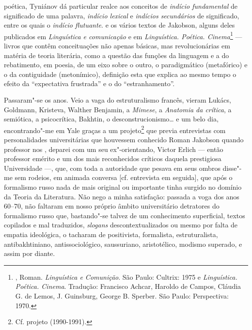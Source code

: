 {{ poética, Tyniánov dá particular realce aos conceitos de \emph{indício
 fundamental} de significado de uma palavra, \emph{indício lexical}
 e \emph{indícios secundários} de significado, entre os quais o
 \emph{indício flutuante}.} e os vários textos de Jakobson, alguns
deles publicados em \emph{Linguística e comunicação} e em
\emph{Linguística. Poética. Cinema}\footnote{, Roman.
 \emph{Linguística e Comunição}. São Paulo: Cultrix: 1975 e
 \emph{Linguística. Poética. Cinema}. Tradução: Francisco Achcar, 
Haroldo de Campos, Cláudia G. de Lemos, J. Guinsburg, George B.
 Sperber. São Paulo: Perspectiva: 1970.} --- livros que contêm conceituações
não apenas básicas, mas revolucionárias em matéria de teoria literária,
como a questão das funções da linguagem e a do rebatimento, em poesia, de
um eixo sobre o outro, o paradigmático (metafórico) e o da contiguidade
(metonímico), definição esta que explica ao mesmo tempo o efeito da
``expectativa frustrada'' e o do ``estranhamento''.

Passaram"-se os anos. Veio a vaga do estruturalismo francês, vieram
Lukács, Goldmann, Kristeva, Walther Benjamin, a \emph{Mimese}, a
\emph{Anatomia da crítica}, a semiótica, a psicocrítica, Bakhtin, o
desconstrucionismo\ldots{} e um belo dia, encontrando"-me em Yale graças a um
projeto\footnote{Cf. projeto  (1990-1991).} que previa
entrevistas com personalidades universitárias que houvessem conhecido
Roman Jakobson quando professor nos , deparei com um seu
ex"-orientando, Victor Erlich --- então professor emérito e um dos mais
reconhecidos críticos daquela prestigiosa Universidade ---, que, com toda
a autoridade que pesava em seus ombros disse"-me sem rodeios, em animada
conversa [cf. entrevista em seguida], que após o formalismo russo nada de mais
original ou importante tinha surgido no domínio da Teoria da Literatura.
Não nego a minha satisfação: passada a voga dos anos 60--70, não faltaram
em nosso próprio âmbito universitário detratores do formalismo russo
que, bastando"-se talvez de um conhecimento superficial, textos
copilados e mal traduzidos, \emph{slogans} descontextualizados ou mesmo por
falta de empatia ideológica, o tacharam de positivista, formalista,
estruturalista, antibakhtiniano, antissociológico, saussuriano,
aristotélico, modismo superado, e assim por diante.

}
